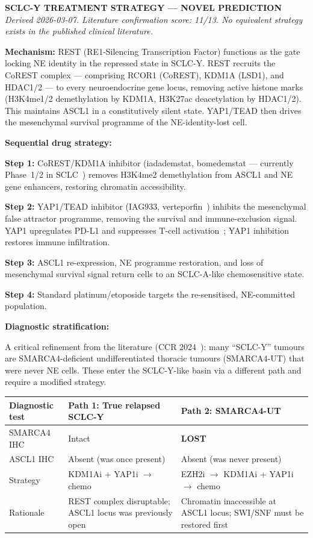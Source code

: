 \documentclass[11pt, a4paper]{article}
\begin{document}
\begin{novelenv}
\textbf{SCLC-Y TREATMENT STRATEGY --- NOVEL PREDICTION}\\
\textit{Derived 2026-03-07. Literature confirmation
score: 11/13. No equivalent strategy exists in the
published clinical literature.}

\medskip
\textbf{Mechanism:}
REST (RE1-Silencing Transcription Factor) functions
as the gate locking NE identity in the repressed state
in SCLC-Y. REST recruits the CoREST complex ---
comprising RCOR1 (CoREST), KDM1A (LSD1), and HDAC1/2
--- to every neuroendocrine gene locus, removing
active histone marks (H3K4me1/2 demethylation by
KDM1A, H3K27ac deacetylation by HDAC1/2). This
maintains ASCL1 in a constitutively silent state.
YAP1/TEAD then drives the mesenchymal survival
programme of the NE-identity-lost cell.

\medskip
\textbf{Sequential drug strategy:}

\textbf{Step 1:} CoREST/KDM1A inhibitor
(iadademstat, bomedemstat --- currently Phase~1/2
in SCLC~\cite{fiedler2022}) removes H3K4me2
demethylation from ASCL1 and NE gene enhancers,
restoring chromatin accessibility.

\textbf{Step 2:} YAP1/TEAD inhibitor (IAG933,
verteporfin~\cite{wu2023}) inhibits the mesenchymal
false attractor programme, removing the survival
and immune-exclusion signal. YAP1 upregulates PD-L1
and suppresses T-cell activation~\cite{wu2023};
YAP1 inhibition restores immune infiltration.

\textbf{Step 3:} ASCL1 re-expression, NE programme
restoration, and loss of mesenchymal survival
signal return cells to an SCLC-A-like
chemosensitive state.

\textbf{Step 4:} Standard platinum/etoposide
targets the re-sensitised, NE-committed population.

\medskip
\textbf{Diagnostic stratification:}

A critical refinement from the literature
(CCR 2024~\cite{augert2024}): many ``SCLC-Y''
tumours are SMARCA4-deficient undifferentiated
thoracic tumours (SMARCA4-UT) that were never
NE cells. These enter the SCLC-Y-like basin via
a different path and require a modified strategy.

\begin{center}
\begin{tabular}{p{3.5cm}p{5cm}p{5cm}}
\toprule
\textbf{Diagnostic test} &
\textbf{Path 1: True relapsed SCLC-Y} &
\textbf{Path 2: SMARCA4-UT} \\
\midrule
SMARCA4 IHC & Intact & \textbf{LOST} \\
ASCL1 IHC & Absent (was once present) & Absent (was never present) \\
\midrule
Strategy & KDM1Ai $+$ YAP1i $\rightarrow$ chemo &
EZH2i $\rightarrow$ KDM1Ai $+$ YAP1i $\rightarrow$ chemo \\
Rationale & REST complex disruptable; ASCL1 locus was previously open &
Chromatin inaccessible at ASCL1 locus; SWI/SNF must be restored first \\
\bottomrule
\end{tabular}
\end{center}


\end{novelenv}
\end{document}
